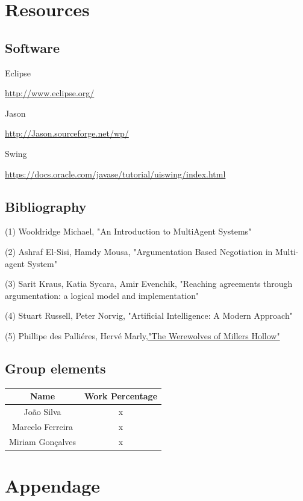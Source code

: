 \documentclass{article}
\begin{document}
\section{Resources}

\subsection{Software}
Eclipse \par
\url{http://www.eclipse.org/} \par
\vspace{3mm}
Jason \par
\url{http://Jason.sourceforge.net/wp/} \par 
Swing \par
\url{https://docs.oracle.com/javase/tutorial/uiswing/index.html} \par
\subsection{Bibliography}
\noindent
(1) Wooldridge Michael, "An Introduction to MultiAgent Systems"

\noindent
(2) Ashraf El-Sisi, Hamdy Mousa, "Argumentation Based Negotiation in Multi-agent System"

\noindent
(3) Sarit Kraus, Katia Sycara, Amir Evenchik, "Reaching agreements through argumentation: a logical model and implementation"

\noindent
(4) Stuart Russell, Peter Norvig, "Artificial Intelligence: A Modern Approach"

\noindent
(5) Phillipe des Palliéres, Hervé Marly,\href{https://images-cdn.asmodee.us/filer_public/16/d8/16d81cd1-7f49-4f2e-a95d-fc408bcef79a/kg01_rules.pdf}{"The Werewolves of Millers Hollow"}

\subsection{Group elements}
\begin{center}
\begin{tabular}{ |c|c| }
\hline
 \textbf{Name} & \textbf{Work Percentage} \\  
 \hline
 João Silva & x \\ 
 \hline
 Marcelo Ferreira & x \\ 
 \hline
 Miriam Gonçalves & x \\ 
 \hline
\end{tabular}
\end{center}
\section{Appendage}
\end{document}
